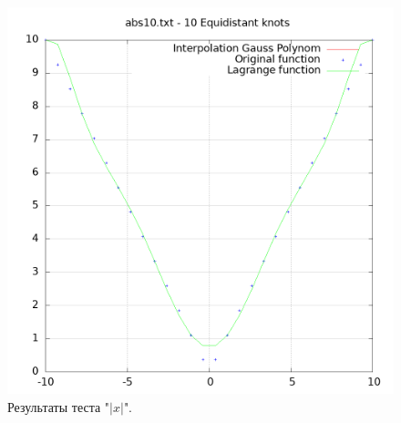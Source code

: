 \documentclass[14pt,a4paper]{extarticle}
\newcommand{\1}{\mathbbm{1}}
\begin{document}
    \begin{figure}
        \centering
        \includegraphics[scale=0.5]{Images/abs10.txt.png}
        \caption{Результаты теста "$|x|$".}
    \end{figure}
\end{document}
